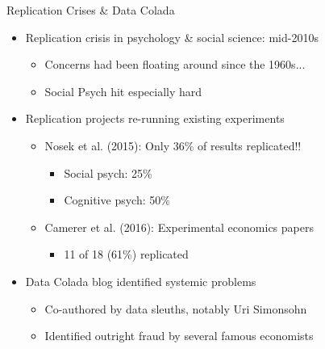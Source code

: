 







\begin{frame}{Replication Crises \& Data Colada}
\begin{itemize}
    \item Replication crisis in psychology \& social science: mid-2010s
    \begin{itemize}
        \item Concerns had been floating around since the 1960s...
        \item Social Psych hit especially hard
    \end{itemize}
    \item Replication projects re-running existing experiments
    \begin{itemize}
        \item Nosek et al. (2015): Only 36\% of results replicated!!
        \begin{itemize}
            \item Social psych: 25\%
            \item Cognitive psych: 50\%
        \end{itemize}
        \item Camerer et al. (2016): Experimental economics papers
        \begin{itemize}
            \item 11 of 18 (61\%) replicated
        \end{itemize}
    \end{itemize}
    \item Data Colada blog identified systemic problems
    \begin{itemize}
        \item Co-authored by data sleuths, notably Uri Simonsohn
        \item Identified outright fraud by several famous economists
    \end{itemize}
\end{itemize}
\end{frame}


